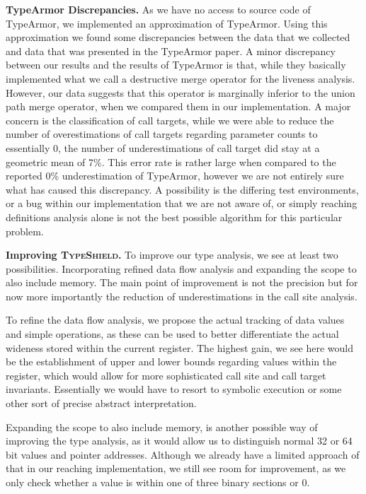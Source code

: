 \textbf{TypeArmor Discrepancies.}
\label{section:discrep}
As we have no access to source code of TypeArmor, we implemented an approximation
of TypeArmor. Using this approximation we found some discrepancies between the data that we collected
and data that was presented in the TypeArmor paper.
A minor discrepancy between our results and the results of TypeArmor is that, while they basically implemented
what we call a destructive merge operator for the liveness analysis. However, our data suggests that this
operator is marginally inferior to the union path merge operator, when we compared them in our implementation.
A major concern is the classification of call targets, while we were able to reduce the number of overestimations
of call targets regarding parameter counts to essentially 0, the number of underestimations of call target did
stay at a geometric mean of 7\%. This error rate is rather large when compared to the reported 0\% underestimation
of TypeArmor, however we are not entirely sure what has caused this discrepancy. A possibility is the differing
test environments, or a bug within our implementation that we are not aware of, or simply reaching definitions
analysis alone is not the best possible algorithm for this particular problem.

\textbf{Improving \textsc{TypeShield}.}
\label{section:venuesimp}
To improve our type analysis, we see at least two possibilities. Incorporating refined data flow analysis and 
expanding the scope to also include memory. The main point of improvement is not the precision but for now 
more importantly the reduction of underestimations in the call site analysis.

To refine the data flow analysis, we propose the actual tracking of data values and simple operations, as these
can be used to better differentiate the actual wideness stored within the current register. The highest gain, 
we see here would be the establishment of upper and lower bounds regarding values within the register, which 
would allow for more sophisticated call site and call target invariants. Essentially we would have to resort 
to symbolic execution or some other sort of precise abstract interpretation.

Expanding the scope to also include memory, is another possible way of improving the type analysis, as it 
would allow us to distinguish normal 32 or 64 bit values and pointer addresses. Although we already have a 
limited approach of that in our reaching implementation, we still see room for improvement, as we only check
whether a value is within one of three binary sections or 0.

